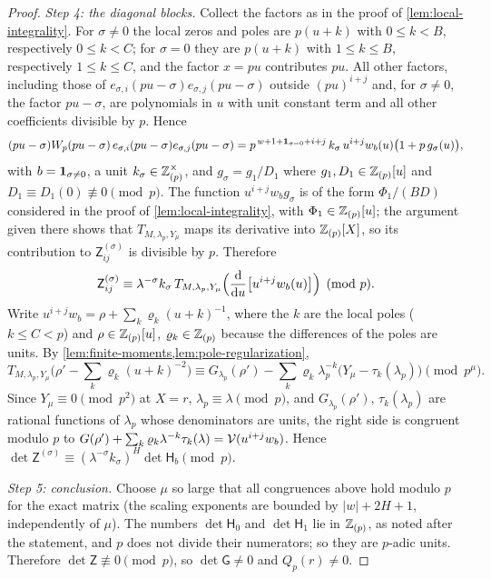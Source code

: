 \begin{proof}
\emph{Step 4: the diagonal blocks.} Collect the factors as in the proof of \cref{lem:local-integrality}. For $\sigma\ne0$ the local zeros and poles are $p(u+k)$ with $0\le k<B$, respectively $0\le k<C$; for $\sigma=0$ they are $p(u+k)$ with $1\le k\le B$, respectively $1\le k\le C$, and the factor $x=pu$ contributes $pu$. All other factors, including those of $e_{\sigma,i}(pu-\sigma)e_{\sigma,j}(pu-\sigma)$ outside $(pu)^{i+j}$ and, for $\sigma\ne0$, the factor $pu-\sigma$, are polynomials in $u$ with unit constant term and all other coefficients divisible by $p$. Hence
\[
(pu-\sigma)W_p(pu-\sigma)\,e_{\sigma,i}(pu-\sigma)e_{\sigma,j}(pu-\sigma)=p^{\,w+1+\mathbf{1}_{\sigma=0}+i+j}\,k_\sigma\,u^{i+j}w_{b}(u)\bigl(1+p\,g_{\sigma}(u)\bigr),
\]
with $b=\mathbf{1}_{\sigma\ne0}$, a unit $k_\sigma\in\mathbb{Z}_{(p)}^\times$, and $g_{\sigma}=g_1/D_1$ where $g_1,D_1\in\mathbb{Z}_{(p)}[u]$ and $D_1\equiv D_1(0)\not\equiv0\pmod p$. The function $u^{i+j}w_bg_\sigma$ is of the form $\Phi_1/(BD)$ considered in the proof of \cref{lem:local-integrality}, with $\Phi_1\in\mathbb{Z}_{(p)}[u]$; the argument given there shows that $T_{M,\lambda_p,Y_\mu}$ maps its derivative into $\mathbb{Z}_{(p)}[X]$, so its contribution to $\mathsf Z^{(\sigma)}_{ij}$ is divisible by $p$. Therefore
\[
\mathsf Z^{(\sigma)}_{ij}\equiv\lambda^{-\sigma}k_\sigma\,T_{M,\lambda_p,Y_\mu}\Bigl(\frac{\mathrm d}{\mathrm du}\bigl[u^{i+j}w_b(u)\bigr]\Bigr)\pmod p .
\]
Write $u^{i+j}w_b=\rho+\sum_k\varrho_k(u+k)^{-1}$, where the $k$ are the local poles ($k\le C<p$) and $\rho\in\mathbb{Z}_{(p)}[u]$, $\varrho_k\in\mathbb{Z}_{(p)}$ because the differences of the poles are units. By \cref{lem:finite-moments,lem:pole-regularization},
\[
T_{M,\lambda_p,Y_\mu}\bigl(\rho'-\textstyle\sum_k\varrho_k(u+k)^{-2}\bigr)\equiv G_{\lambda_p}(\rho')-\sum_k\varrho_k\lambda_p^{-k}\bigl(Y_\mu-\tau_k(\lambda_p)\bigr)\pmod{p^\mu}.
\]
Since $Y_\mu\equiv0\pmod{p^2}$ at $X=r$, $\lambda_p\equiv\lambda\pmod p$, and $G_{\lambda_p}(\rho')$, $\tau_k(\lambda_p)$ are rational functions of $\lambda_p$ whose denominators are units, the right side is congruent modulo $p$ to $G(\rho')+\sum_k\varrho_k\lambda^{-k}\tau_k(\lambda)=\mathcal{V}(u^{i+j}w_b)$. Hence $\det\mathsf Z^{(\sigma)}\equiv(\lambda^{-\sigma}k_\sigma)^H\det\mathsf H_b\pmod p$.

\emph{Step 5: conclusion.} Choose $\mu$ so large that all congruences above hold modulo $p$ for the exact matrix (the scaling exponents are bounded by $|w|+2H+1$, independently of $\mu$). The numbers $\det\mathsf H_0$ and $\det\mathsf H_1$ lie in $\mathbb{Z}_{(p)}$, as noted after the statement, and $p$ does not divide their numerators; so they are $p$-adic units. Therefore $\det\mathsf Z\not\equiv0\pmod p$, so $\det\mathsf G\ne0$ and $Q_p(r)\ne0$.
\end{proof}


